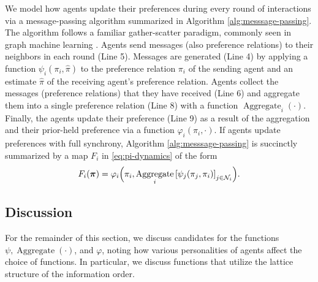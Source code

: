 \documentclass[conference]{ieeeconf}
\newcommand{\N}{\mathcal{N}}
\newcommand{\profile}{\boldsymbol{\pi}}
\DeclareMathOperator{\Aggregate}{Aggregate}
\begin{document}
We model how agents update their preferences during every round of interactions via a message-passing algorithm summarized in Algorithm \ref{alg:messsage-passing}. The algorithm follows a familiar gather-scatter paradigm, commonly seen in graph machine learning \cite{dudzik2022,dudzik2023}. Agents send messages (also preference relations) to their neighbors in each round (Line 5). Messages are generated (Line 4) by applying a function $\psi_i(\pi_i,\hat{\pi})$ to the preference relation $\pi_i$ of the sending agent and an estimate $\hat{\pi}$ of the receiving agent's preference relation.
Agents collect the messages (preference relations) that they have received (Line 6) and aggregate them into a single preference relation (Line 8) with a  function $\Aggregate_i(\cdot)$.
Finally, the agents update their preference (Line 9) as a result of the aggregation and their prior-held preference via a function  $\varphi_i(\pi_i,\cdot)$. If agents update preferences with full synchrony, Algorithm \ref{alg:messsage-passing} is succinctly summarized by a map $F_i$ in \eqref{eq:pi-dynamics} of the form
\begin{align}
    F_i(\profile) = \varphi_i\Bigl(\pi_i, \Aggregate_i{\left[ \psi_j(\pi_j, \pi_i)\right]_{j \in \N_i}} \Bigr). \label{eq:message-passing}
\end{align}

\vspace{-0.25em}
\subsection{Discussion}
\vspace{-0.25em}

For the remainder of this section, we discuss candidates for the functions $\psi, \Aggregate(\cdot)$, and $\varphi$, noting how various personalities of agents affect the choice of functions. In particular, we discuss functions that utilize the lattice structure of the information order.
\end{document}
